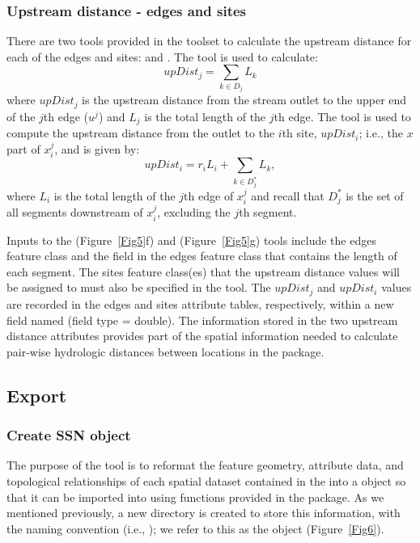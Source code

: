 \documentclass[article]{jss}
\begin{document}
\subsubsection{Upstream distance - edges and sites}

There are two tools provided in the  toolset to calculate
the upstream distance for each of the edges and sites:  and . The  tool is used to calculate:
\[
	upDist_j = \sum_{k \in D_j} L_k
\]
where $upDist_j$ is the upstream distance from the stream outlet to the upper end of the $j$th edge ($u^j$) and $L_j$ is the total length of the $j$th edge. The  tool is used to compute the upstream distance from the outlet to the $i$th site, $upDist_i$; i.e., the $x$ part of $x_i^j$, and is given by:
\[
	upDist_i = r_i L_i + \sum_{k \in D_j^*} L_k,
\]
where $L_i$ is the total length of the $j$th edge of $x_i^j$ and
recall that $D_j^*$ is the set of all segments downstream of $x_i^j$,
excluding the $j$th segment. 

Inputs to the  (Figure~\ref{Fig5}f)
and  (Figure~\ref{Fig5}g) tools include the  edges feature class
and the field in the edges feature class that contains the length of
each segment. The sites feature class(es) that the
upstream distance values will be assigned to must also be specified in the
 tool. The $upDist_j$ and $upDist_i$ values are
recorded in the edges and sites attribute tables, respectively, within
a new field named  (field type = double). The information
stored in the two upstream distance attributes provides part of the
spatial information needed to calculate pair-wise hydrologic distances
between locations in the  package.



\subsection{Export}

\subsubsection{Create SSN object} \label{createLSN}

The purpose of the  tool  is to reformat the
feature geometry, attribute data, and topological relationships of
each spatial dataset contained in the  into a  object so that it can be imported into  using functions provided in the  package. As we mentioned previously, a new directory is created to store this information, with the naming convention  (i.e., ); we refer to this as the  object (Figure~\ref{Fig6}).
\end{document}

